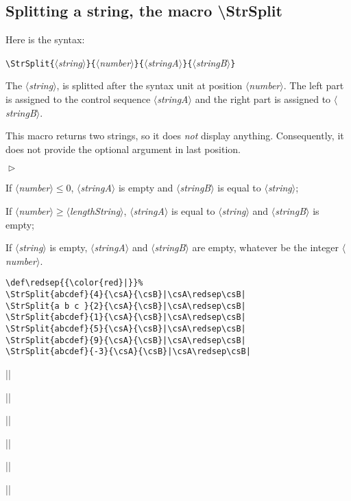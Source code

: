 \documentclass[a4paper,10pt]{article}
\newcommand\argu[1]{$\langle$\textit{#1}$\rangle$}
\newcommand\ARGU[1]{\texttt{\{}\argu{#1}\texttt{\}}}
\newenvironment{Conditions}[1][1cm]%
{\begin{list}%
	{$\vartriangleright$}%
	{\setlength{\leftmargin}{#1}
	 \setlength{\itemsep}{0pt}
	 \setlength{\parsep}{0pt}
	 \setlength{\topsep}{2ptplus3ptminus2pt}
	}}%
{\end{list}}
\newcommand\US{syntax unit\xspace}
\newcommand\styleexercice{\footnotesize}
\newcommand\verbinline{\lstinline[basicstyle=\normalsize\ttfamily]}
\begin{document}
\subsection{Splitting a string, the macro {\ttfamily\textbackslash StrSplit}}
\label{StrSplit}
Here is the syntax:\smallskip

\verbinline|\StrSplit|\ARGU{string}\ARGU{number}\ARGU{stringA}\ARGU{stringB}
\smallskip

The \argu{string}, is splitted after the \US at position \argu{number}. The left part is assigned to the control sequence \argu{stringA} and the right part is assigned to \argu{stringB}.\par
This macro returns two strings, so it does \emph{not} display anything. Consequently, it does not provide the optional argument in last position.\medskip

\begin{Conditions}
	\item If \argu{number}${}\leqslant0$, \argu{stringA} is empty and \argu{stringB} is equal to \argu{string};
	\item If \argu{number}${}\geqslant$\argu{lengthString}, \argu{stringA} is equal to \argu{string} and \argu{stringB} is empty;
	\item If \argu{string} is empty, \argu{stringA} and \argu{stringB} are empty, whatever be the integer \argu{number}.
\end{Conditions}

\begin{minipage}[c]{0.65\linewidth}

\begin{lstlisting}
\def\redsep{{\color{red}|}}%
\StrSplit{abcdef}{4}{\csA}{\csB}|\csA\redsep\csB|
\StrSplit{a b c }{2}{\csA}{\csB}|\csA\redsep\csB|
\StrSplit{abcdef}{1}{\csA}{\csB}|\csA\redsep\csB|
\StrSplit{abcdef}{5}{\csA}{\csB}|\csA\redsep\csB|
\StrSplit{abcdef}{9}{\csA}{\csB}|\csA\redsep\csB|
\StrSplit{abcdef}{-3}{\csA}{\csB}|\csA\redsep\csB|
\end{lstlisting}%
\end{minipage}\hfill
\begin{minipage}[c]{0.35\linewidth}
	\styleexercice
	\def\redsep{{\color{red}|}}%
	|\csA\redsep\csB|\par
	|\csA\redsep\csB|\par
	|\csA\redsep\csB|\par
	|\csA\redsep\csB|\par
	|\csA\redsep\csB|\par
	|\csA\redsep\csB|
\end{minipage}%
\end{document}
